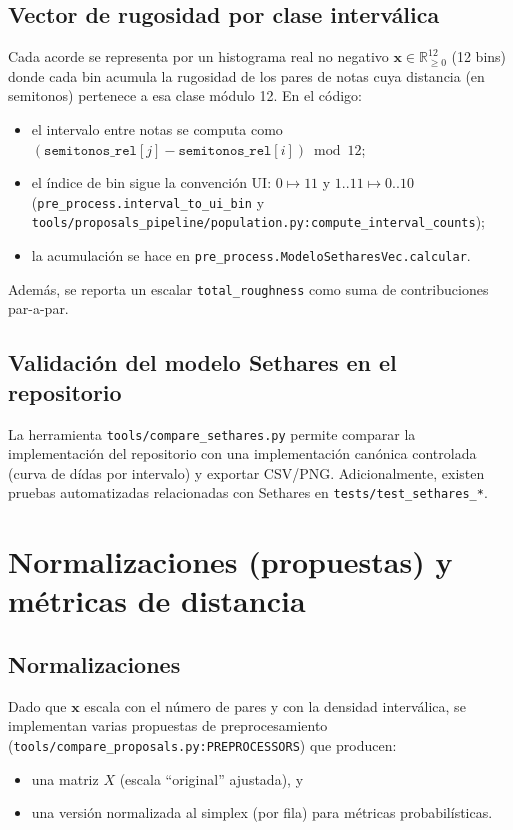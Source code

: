 \subsection{Vector de rugosidad por clase interválica}
Cada acorde se representa por un histograma real no negativo $\mathbf{x}\in\mathbb{R}_{\ge 0}^{12}$ (12 bins) donde cada bin acumula la rugosidad de los pares de notas cuya distancia (en semitonos) pertenece a esa clase módulo 12. En el código:
\begin{itemize}
  \item el intervalo entre notas se computa como $(\texttt{semitonos\_rel}[j]-\texttt{semitonos\_rel}[i])\bmod 12$;
  \item el índice de bin sigue la convención UI: $0\mapsto 11$ y $1..11\mapsto 0..10$ (\texttt{pre\_process.interval\_to\_ui\_bin} y \texttt{tools/proposals\_pipeline/population.py:compute\_interval\_counts});
  \item la acumulación se hace en \texttt{pre\_process.ModeloSetharesVec.calcular}.
\end{itemize}
Además, se reporta un escalar \texttt{total\_roughness} como suma de contribuciones par-a-par.

\subsection{Validación del modelo Sethares en el repositorio}
La herramienta \texttt{tools/compare\_sethares.py} permite comparar la implementación del repositorio con una implementación canónica controlada (curva de dídas por intervalo) y exportar CSV/PNG. Adicionalmente, existen pruebas automatizadas relacionadas con Sethares en \texttt{tests/test\_sethares\_*}.

\section{Normalizaciones (propuestas) y métricas de distancia}
\label{sec:distancias}

\subsection{Normalizaciones}
Dado que $\mathbf{x}$ escala con el número de pares y con la densidad interválica, se implementan varias propuestas de preprocesamiento (\texttt{tools/compare\_proposals.py:PREPROCESSORS}) que producen:
\begin{itemize}
  \item una matriz $X$ (escala “original” ajustada), y
  \item una versión normalizada al simplex (por fila) para métricas probabilísticas.
\end{itemize}


